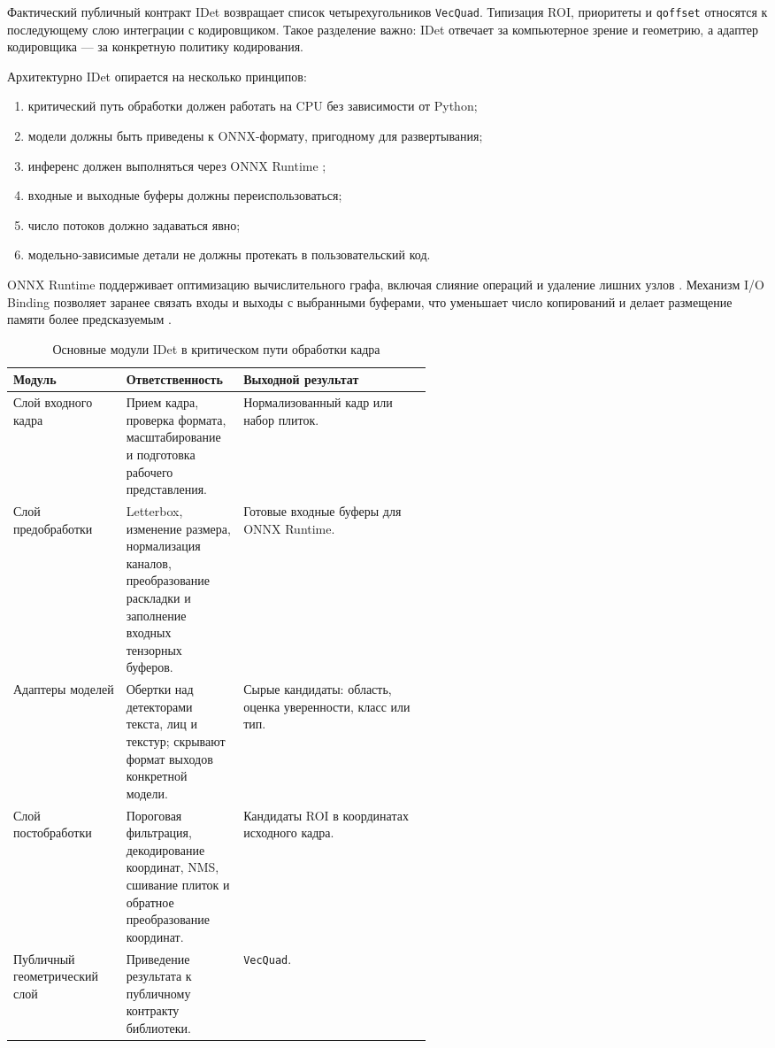 \documentclass[12pt,a4paper,oneside,openany]{report}
\begin{document}
Фактический публичный контракт IDet возвращает список четырехугольников \texttt{VecQuad}.
Типизация ROI, приоритеты и \texttt{qoffset} относятся к последующему слою интеграции с
кодировщиком. Такое разделение важно: IDet отвечает за компьютерное зрение и геометрию, а
адаптер кодировщика --- за конкретную политику кодирования.

Архитектурно IDet опирается на несколько принципов:
\begin{enumerate}[label=\arabic*)]
  \item критический путь обработки должен работать на CPU без зависимости от Python;
  \item модели должны быть приведены к ONNX-формату, пригодному для развертывания;
  \item инференс должен выполняться через ONNX Runtime \cite{onnx,onnxruntime};
  \item входные и выходные буферы должны переиспользоваться;
  \item число потоков должно задаваться явно;
  \item модельно-зависимые детали не должны протекать в пользовательский код.
\end{enumerate}

ONNX Runtime поддерживает оптимизацию вычислительного графа, включая слияние операций и удаление
лишних узлов \cite{ort_graph_optim}. Механизм I/O Binding позволяет заранее связать входы и
выходы с выбранными буферами, что уменьшает число копирований и делает размещение памяти более
предсказуемым \cite{ort_iobinding}.

\begin{table}[!htbp]
  \centering
  \caption{Основные модули IDet в критическом пути обработки кадра}
  \label{tab:idet_modules}
  \small
  \begin{tabularx}{\linewidth}{@{}P{0.27\linewidth}P{0.28\linewidth}Y@{}}
    \toprule
    Модуль & Ответственность & Выходной результат \\
    \midrule
    Слой входного кадра &
    Прием кадра, проверка формата, масштабирование и подготовка рабочего представления. &
    Нормализованный кадр или набор плиток. \\
    Слой предобработки &
    Letterbox, изменение размера, нормализация каналов, преобразование раскладки и заполнение
      входных тензорных буферов. &
    Готовые входные буферы для ONNX Runtime. \\
    Адаптеры моделей &
    Обертки над детекторами текста, лиц и текстур; скрывают формат выходов конкретной модели. &
    Сырые кандидаты: область, оценка уверенности, класс или тип. \\
    Слой постобработки &
    Пороговая фильтрация, декодирование координат, NMS, сшивание плиток и обратное
      преобразование координат. &
    Кандидаты ROI в координатах исходного кадра. \\
    Публичный геометрический слой &
    Приведение результата к публичному контракту библиотеки. &
    \texttt{VecQuad}. \\
    \bottomrule
  \end{tabularx}
\end{table}
\end{document}
